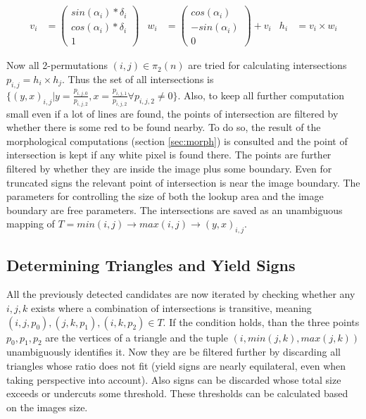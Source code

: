 \documentclass{report}
\begin{document}
\begin{align}\label{eq:poi}
  v_i & = \begin{pmatrix}
    sin(\alpha_i) * \delta_i \\ cos(\alpha_i) * \delta_i \\ 1
  \end{pmatrix}
  &
  w_i & = \begin{pmatrix}
    cos(\alpha_i) \\ -sin(\alpha_i) \\ 0
  \end{pmatrix} + v_i
  &
  h_i & = v_i \times w_i
\end{align}

Now all 2-permutations \( (i, j) \in \pi_2(n) \) are tried for
calculating intersections \( p_{i,j} = h_i \times h_j \). Thus the set
of all intersections is \(\{ (y, x)_{i, j} | y = \frac{p_{i, j,
    0}}{p_{i, j, 2}}, x = \frac{p_{i, j, 1}}{p_{i, j, 2}} \forall
p_{i, j, 2} \neq 0 \}\). Also, to keep all further computation small
even if a lot of lines are found, the points of intersection are
filtered by whether there is some red to be found nearby. To do so,
the result of the morphological computations (section \ref{sec:morph})
is consulted and the point of intersection is kept if any white pixel
is found there. The points are further filtered by whether they are
inside the image plus some boundary. Even for truncated signs the
relevant point of intersection is near the image boundary. The
parameters for controlling the size of both the lookup area and the
image boundary are free parameters. The intersections are saved as an
unambiguous mapping of \( T = min(i, j) \to max(i, j) \to (y, x)_{i,
  j} \).


\subsection{Determining Triangles and Yield Signs}

All the previously detected candidates are now iterated by checking
whether any \( i, j, k \) exists where a combination of intersections
is transitive, meaning \( (i, j, p_0), (j, k, p_1), (i, k, p_2) \in T
\). If the condition holds, than the three points \( p_0, p_1, p_2 \)
are the vertices of a triangle and the tuple \( (i, min(j,k),
max(j,k)) \) unambiguously identifies it. Now they are be filtered
further by discarding all triangles whose ratio does not fit (yield
signs are nearly equilateral, even when taking perspective into
account). Also signs can be discarded whose total size exceeds or
undercuts some threshold. These thresholds can be calculated based on
the images size.
\end{document}
